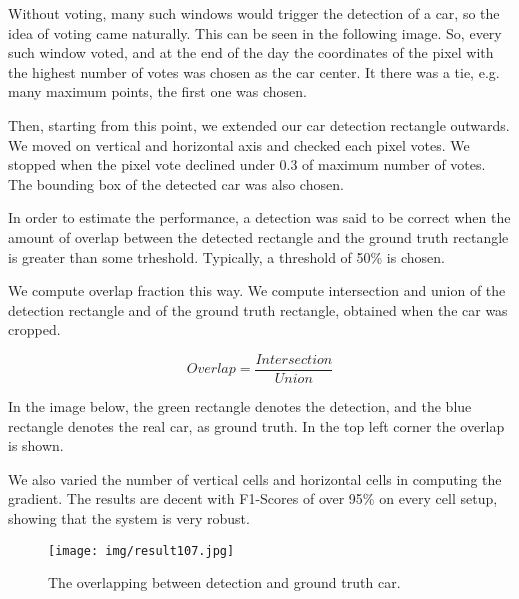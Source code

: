 Without voting, many such windows would trigger the detection of a car, so the idea of voting came naturally. This can be seen in the following image. So, every such window voted, and at the end of the day the coordinates of the pixel with the highest number of votes was chosen as the car center. It there was a tie, e.g. many maximum points, the first one was chosen.



Then, starting from this point, we extended our car detection rectangle outwards. We moved on vertical and horizontal axis and checked each pixel votes. We stopped when the pixel vote declined under 0.3 of maximum number of votes. The bounding box of the detected car was also chosen.

In order to estimate the performance, a detection was said to be correct when the amount of overlap between the detected rectangle and the ground truth rectangle is greater than some trheshold. Typically, a threshold of 50\% is chosen.

We compute overlap fraction this way. We compute intersection and union of the detection rectangle and of the ground truth rectangle, obtained when the car was cropped.


\begin{equation}
Overlap = \frac{Intersection}{Union}
\end{equation}

In the image below, the green rectangle denotes the detection, and the blue rectangle denotes the real car, as ground truth. In the top left corner the overlap is shown.

We also varied the number of vertical cells and horizontal cells in computing the gradient. The results are decent with F1-Scores of over 95\% on every cell setup, showing that the system is very robust.

\begin{figure}[htb]
	\begin{center}
		\texttt{[image: img/result107.jpg]}
	    \caption{The overlapping between detection and ground truth car.\label{img:result107}}
    \end{center}
\end{figure}
